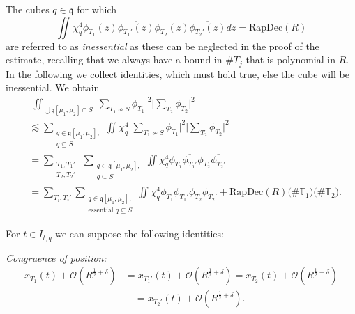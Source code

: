 \documentclass{amsart}
\theoremstyle{definition}
\newcommand{\T}{\mathbb{T}}
\begin{document}
The cubes $q \in \mathfrak{q}$ for which
\begin{equation*}
\iint \chi_q^4 \phi_{T_1}(z) \overline{\phi_{T_1'}(z)} \phi_{T_2}(z) \overline{\phi_{T_2'}(z)} dz = \text{RapDec}(R)
\end{equation*}
are referred to as \emph{inessential} as these can be neglected in the proof of the estimate, recalling that we always have a bound in $\# T_j$ that is polynomial in $R$.
In the following we collect identities, which must hold true, else the cube will be inessential.
We obtain
\begin{equation}
\label{eq:EssentialDecomposition}
\begin{split}
    &\; \iint_{\bigcup \mathfrak{q}[\mu_1,\mu_2] \cap S} \big| \sum_{T_1 \not\sim S} \phi_{T_1} \big|^2 \big| \sum_{T_2 } \phi_{T_2} \big|^2 \\
    &\lesssim \sum_{\substack{q \in \mathfrak{q}[\mu_1,\mu_2], \\ q \subseteq S}} \iint \chi_q^4 \big| \sum_{T_1 \not \sim S} \phi_{T_1} \big|^2 \big| \sum_{T_2} \phi_{T_2} \big|^2 \\
    &= \sum_{\substack{T_1, T_1'. \\ T_2, T_2'}} \sum_{\substack{q \in \mathfrak{q}[\mu_1,\mu_2], \\ q \subseteq S}} \iint \chi_q^4 \phi_{T_1} \overline{\phi_{T_1'}} \phi_{T_2} \overline{\phi_{T_2'}} \\
    &= \sum_{T_i, T_j'} \sum_{\substack{q \in \mathfrak{q}[\mu_1,\mu_2], \\ \text{essential } q \subseteq S}} \iint \chi_q^4 \phi_{T_1} \overline{\phi_{T_1'}} \phi_{T_2} \overline{\phi_{T_2'}} + \text{RapDec}(R) \big( \# \T_1 \big) \big( \# \T_2 \big).
\end{split}
\end{equation}

For $t \in I_{t,q}$ we can suppose the following identities:

\smallskip

\emph{Congruence of position:}
\begin{equation}
\label{eq:CongruencePosition}
\begin{split}
x_{T_1}(t) + \mathcal{O}(R^{\frac{1}{2}+\delta}) &= x_{T_1'}(t) + \mathcal{O}(R^{\frac{1}{2}+\delta}) = x_{T_2}(t) + \mathcal{O}(R^{\frac{1}{2}+\delta}) \\
&\quad = x_{T_2'}(t) + \mathcal{O}(R^{\frac{1}{2}+\delta}).
\end{split}
\end{equation}
\end{document}
